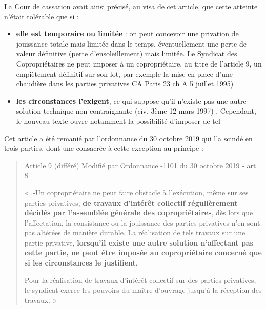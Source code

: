 				La Cour de cassation avait ainsi précisé, au visa de cet article, que cette atteinte n’était tolérable que si :
				\begin{itemize}
					\item \textbf{elle est temporaire ou limitée} : on peut concevoir une privation de jouissance totale mais limitée dans le temps, éventuellement une perte de valeur définitive (perte d’ensoleillement) mais limitée. Le Syndicat des Copropriétaires ne peut imposer à un copropriétaire, au titre de l’article 9, un empiètement définitif sur son lot, par exemple la mise en place d’une chaudière dans les parties privatives CA Paris 23 ch A 5 juillet 1995)
					\item \textbf{les circonstances l’exigent}, ce qui suppose qu’il n’existe pas une autre solution technique non contraignante (civ. 3ème 12 mars 1997) . Cependant, le nouveau texte ouvre notamment la possibilité d’imposer de tel
				\end{itemize}
				
				Cet article a été remanié par l’ordonnance du 30 octobre 2019 qui l’a scindé en trois parties, dont une consacrée à cette exception au principe :
				\begin{quote}
					Article 9 (différé) Modifié par Ordonnance -1101 du 30 octobre 2019 - art. 8
					
					« \II.-Un copropriétaire ne peut faire obstacle à l'exécution, même sur ses parties privatives, \textbf{de travaux d'intérêt collectif régulièrement décidés par l'assemblée générale des copropriétaires}, dès lors que l'affectation, la consistance ou la jouissance des parties privatives n'en sont pas altérées de manière durable. La réalisation de tels travaux sur une partie privative, \textbf{lorsqu'il existe une autre solution n'affectant pas cette partie, ne peut être imposée au copropriétaire concerné que si les circonstances le justifient}.
					
					Pour la réalisation de travaux d'intérêt collectif sur des parties privatives, le syndicat exerce les pouvoirs du maître d'ouvrage jusqu'à la réception des travaux. »
				\end{quote}
				
